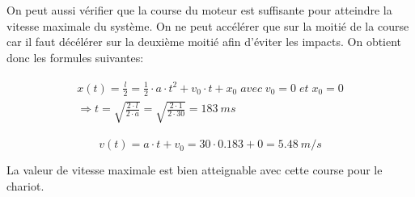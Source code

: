 On peut aussi vérifier que la course du moteur est suffisante pour atteindre la vitesse maximale du système. On ne peut accélérer que sur la
moitié de la course car il faut décélérer sur la deuxième moitié afin d'éviter les impacts. On obtient donc les formules suivantes:

\begin{align}\label{eq:TempsMouv}
  \begin{split}
    x(t) = \frac{l}{2} = \frac{1}{2} \cdot a \cdot t^2 + v_0 \cdot t + x_0 \; avec \; v_0 = 0 \; et \; x_0 = 0 \\ \Rightarrow t = \sqrt{\frac{2 \cdot l}{2 \cdot a}} = \sqrt{\frac{2 \cdot 1}{2 \cdot 30}} = 183~ms
  \end{split}
\end{align}

\begin{equation}
  v(t) = a \cdot t + v_0 = 30 \cdot 0.183 + 0 = 5.48~m/s
\end{equation}

La valeur de vitesse maximale est bien atteignable avec cette course pour le chariot.